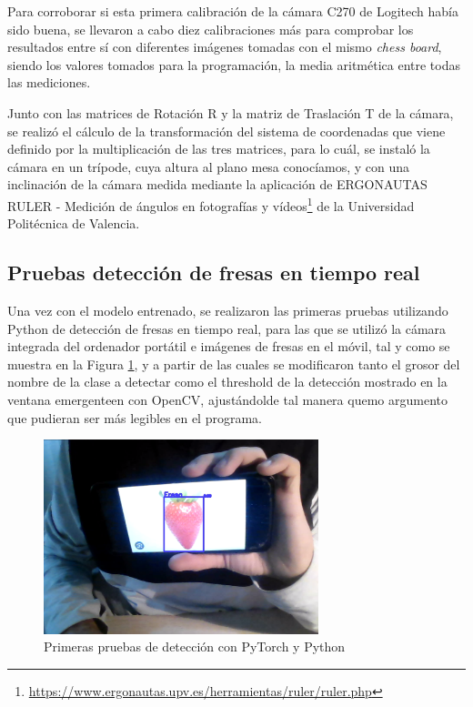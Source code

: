 Para corroborar si esta primera calibración de la cámara C270 de Logitech había sido buena, se llevaron a cabo diez calibraciones más para comprobar los resultados entre sí con diferentes imágenes tomadas con el mismo \textit{chess board}, siendo los valores tomados para la programación, la media aritmética entre todas las mediciones.

Junto con las matrices de Rotación R y la matriz de Traslación T de la cámara, se realizó el cálculo de la transformación del sistema de coordenadas que viene definido por la multiplicación de las tres matrices, para lo cuál, se instaló la cámara en un trípode, cuya altura al plano mesa conocíamos, y con una inclinación de la cámara medida mediante la aplicación de ERGONAUTAS RULER - Medición de ángulos en fotografías y vídeos\footnote{\url{https://www.ergonautas.upv.es/herramientas/ruler/ruler.php}} de la Universidad Politécnica de Valencia.

\subsection{Pruebas detección de fresas en tiempo real}
\label{sec:Pruebas_Fresas_Pytorch}

Una vez con el modelo entrenado, se realizaron las primeras pruebas utilizando Python de detección de fresas en tiempo real, para las que se utilizó la cámara integrada del ordenador portátil e imágenes de fresas en el móvil, tal y como se muestra en la Figura \ref{fig:primerasdetecciones_Python}, y a partir de las cuales se modificaron tanto el grosor del nombre de la clase a detectar como el threshold de la detección mostrado en la ventana emergenteen con OpenCV, ajustándolde tal manera quemo argumento que pudieran ser más legibles en el programa.

 \begin{figure}[H]
     \centering
     \begin{center}
       \includegraphics[width=80mm]{figs/deteccion_video fresa en foto.png}
     \end{center}
     \caption{Primeras pruebas de detección con PyTorch y Python}
    \label{fig:primerasdetecciones_Python}
  \end{figure}

